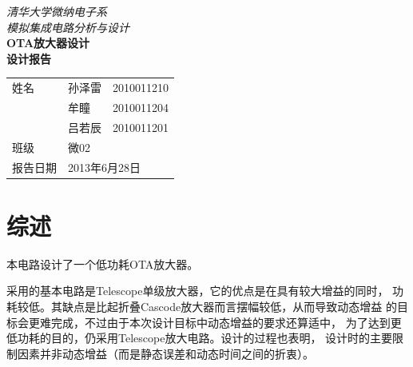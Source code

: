 \documentclass[a4paper]{article}
\newcommand{\HUGE}{\fontsize{29pt}{29pt}\selectfont}
\begin{document}
\begin{titlepage}

\phantom{Start!}
\vspace{-1.7cm}

\begin{flushleft}

\emph{\Large 清华大学微纳电子系}\\[0.2cm]
\emph{\Large 模拟集成电路分析与设计}\\[4.2cm]     %

{ \HUGE \bfseries OTA放大器设计}\\[0.4cm]    %
{ \huge \bfseries 设计报告}             %

\end{flushleft}

\vfill

\begin{flushright}

{
\newcommand{\pillar}{ {\Huge \phantom{A}} } %
\large \begin{tabular}{lll}
  \pillar 姓名 & 孙泽雷 & 2010011210 \\
  \pillar&牟瞳 & 2010011204          \\
  \pillar&吕若辰 & 2010011201        \\
  \pillar 班级 & 微02 &               \\
  \pillar 报告日期 & \multicolumn{2}{l}{2013年6月28日}  \\
\end{tabular}
}

\end{flushright}

\end{titlepage}

\newpage

\pagestyle{fancy}
\fancyhead{}    %


\section{综述}

本电路设计了一个低功耗OTA放大器。

采用的基本电路是Telescope单级放大器，它的优点是在具有较大增益的同时，
功耗较低。其缺点是比起折叠Cascode放大器而言摆幅较低，从而导致动态增益
的目标会更难完成，不过由于本次设计目标中动态增益的要求还算适中，
为了达到更低功耗的目的，仍采用Telescope放大电路。设计的过程也表明，
设计时的主要限制因素并非动态增益（而是静态误差和动态时间之间的折衷）。
\end{document}
